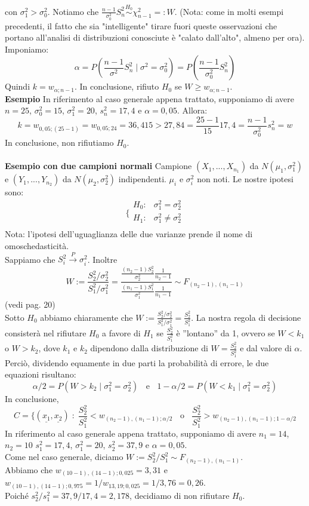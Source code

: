 con $\sigma_1^2 > \sigma_0^2$.
Notiamo che $\frac{n-1}{\sigma_0^2} S_n^2 \stackrel{H_0}{\sim} \chi_{n-1}^2 =: W$. (Nota: come in molti esempi precedenti, il fatto che sia "intelligente" tirare fuori queste osservazioni che portano all'analisi di distribuzioni conosciute è "calato dall'alto", almeno per ora).\\
Imponiamo:
$$\alpha = P \left( \frac{n-1}{\sigma^2} S_n^2 \mid \sigma^2=\sigma_0^2 \right) = P \left( \frac{n-1}{\sigma_0^2} S_n^2 \right)$$
Quindi $k=w_{\alpha;n-1}$. In conclusione, rifiuto $H_0$ se $W \geq w_{\alpha;n-1}$.\\
\textbf{Esempio} In riferimento al caso generale appena trattato, supponiamo di avere $n=25$, $\sigma_0^2=15$, $\sigma_1^2=20$, $s_n^2=17,4$ e $\alpha=0,05$. Allora:
$$k=w_{0,05;(25-1)} = w_{0,05;24} = 36,415 > 27,84 = \frac{25-1}{15} 17,4 = \frac{n-1}{\sigma_0^2} s_n^2 = w$$
In conclusione, non rifiutiamo $H_0$.\\
\\
\textbf{Esempio con due campioni normali} Campione $(X_1,...,X_{n_1})$ da $N(\mu_1,\sigma_1^2)$ e $(Y_1,...,Y_{n_2})$ da $N(\mu_2,\sigma_2^2)$ indipendenti. $\mu_i$ e $\sigma_i^2$ non noti. Le nostre ipotesi sono:
$$\bigg \{
\begin{array}{rl}
H_0: & \sigma_1^2=\sigma_2^2 \\
H_1: & \sigma_1^2 \neq \sigma_2^2 \\
\end{array}
$$
Nota: l'ipotesi dell'uguaglianza delle due varianze prende il nome di omoschedasticità.\\
Sappiamo che $S_i^2 \stackrel{P}{\rightarrow} \sigma_i^2$. Inoltre
$$W:= \frac{S_2^2 / \sigma_2^2}{S_1^2 / \sigma_1^2} = 
\frac{\frac{(n_2-1) S_2^2}{\sigma_2^2} \frac{1}{n_2-1}} {\frac{(n_1-1) S_1^2}{\sigma_1^2} \frac{1}{n_1-1}} 
\sim F_{(n_2-1),(n_1-1)}$$
(vedi pag. 20)\\
Sotto $H_0$ abbiamo chiaramente che $W:= \frac{S_2^2 / \sigma_2^2}{S_1^2 / \sigma_1^2} = \frac{S_2^2}{S_1^2}$. La nostra regola di decisione consisterà nel rifiutare $H_0$ a favore di $H_1$ se $\frac{S_2^2}{S_1^2}$ è ''lontano'' da 1, ovvero se $W<k_1$ o $W>k_2$, dove $k_1$ e $k_2$ dipendono dalla distribuzione di $W= \frac{S_2^2}{S_1^2}$ e dal valore di $\alpha$. Perciò, dividendo equamente in due parti la probabilità di errore, le due equazioni risultano:
$$\alpha/2 = P(W>k_2 \mid \sigma_1^2=\sigma_2^2) \; \; \text{ e } \; \; 1-\alpha/2 = P(W<k_1 \mid \sigma_1^2=\sigma_2^2)$$
In conclusione, 
$$C= \lbrace (\underline{x_1},\underline{x_2}) \; : \; \frac{S_2^2}{S_1^2} < w_{(n_2-1),(n_1-1);\alpha/2} \; \; \text{ o } \; \; \frac{S_2^2}{S_1^2} > w_{(n_2-1),(n_1-1);1-\alpha/2}$$
In riferimento al caso generale appena trattato, supponiamo di avere $n_1=14$, $n_2=10$ $s_1^2=17,4$, $\sigma_1^2=20$, $s_2^2=37,9$ e $\alpha=0,05$.\\
Come nel caso generale, diciamo $W:=S_2^2/S_1^2 \sim F_{(n_2-1),(n_1-1)}$.\\
Abbiamo che $w_{(10-1),(14-1);0,025}=3,31$ e $w_{(10-1),(14-1);0,975}=1/w_{13,19;0,025}=1/3,76=0,26$.\\
Poiché $s_2^2/s_1^2=37,9/17,4=2,178$, decidiamo di non rifiutare $H_0$.